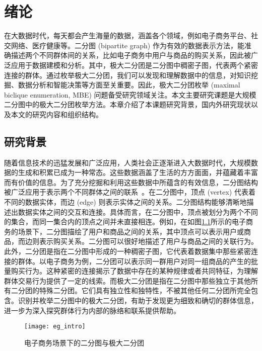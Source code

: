 \chapter{绪论}

在大数据时代，每天都会产生海量的数据，涵盖各个领域，例如电子商务平台、社交网络、医疗健康等。二分图 (bipartite graph) 作为有效的数据表示方法，能准确描述两个不同群体间的关系，比如电子商务中用户与商品的购买关系，因此被广泛应用于数据建模和分析。其中，极大二分团是二分图中稠密子图，代表两个紧密连接的群体。通过枚举极大二分团，我们可以发现和理解数据中的信息，对知识挖掘、数据分析和智能决策等方面至关重要。因此，极大二分团枚举 (maximal biclique enumeration, MBE) 问题备受研究领域关注。本文主要研究课题是大规模二分图中的极大二分团枚举方法。本章介绍了本课题研究背景，国内外研究现状以及本文的研究内容和组织结构。

\section{研究背景}

随着信息技术的迅猛发展和广泛应用，人类社会正逐渐进入大数据时代，大规模数据的生成和积累已成为一种常态。这些数据涵盖了生活的方方面面，并蕴藏着丰富而有价值的信息。为了充分挖掘和利用这些数据中所蕴含的有效信息，二分图结构被广泛应用于表示两个不同群体之间的联系~\cite{bipartite22}。在二分图中，顶点 (vertex) 代表着不同的数据实体，而边 (edge) 则表示实体之间的关系。二分图结构能够清晰地描述出数据实体之间的交互和连接。具体而言，在二分图中，顶点被划分为两个不同的集合，而同一集合内的顶点之间并未直接相连。例如，在如图\ref{fig:eg_intro}所示的电子商务的场景下，二分图描绘了用户和商品之间的关系，其中顶点可以表示用户或商品，而边则表示购买关系。二分图可以很好地描述了用户与商品之间的关联行为。此外，二分团是指在二分图中形成的一种稠密子图，它代表着数据集中那些紧密连接的群体。以电子商务为例，二分团可以表示同一群用户对同一组商品的产生的批量购买行为。这种紧密的连接揭示了数据中存在的某种规律或者共同特征，为理解群体交易行为提供了一定的线索。而极大二分团是指在二分图中那些独立于其他所有二分团的特殊二分团。它们具有独立性和独特性，不被其他任何二分团所完全包含。识别并枚举二分图中的极大二分团，有助于发现更为细致和确切的群体信息，进一步为深入探究群体行为内部的脉络和联系提供帮助。

\begin{figure} [ht]
  \centering
  \vspace{0.1in}
  \texttt{[image: eg\_intro]}
  \vspace{0.1in}
  \caption{电子商务场景下的二分图与极大二分团}
  \label{fig:eg_intro}
\end{figure}


